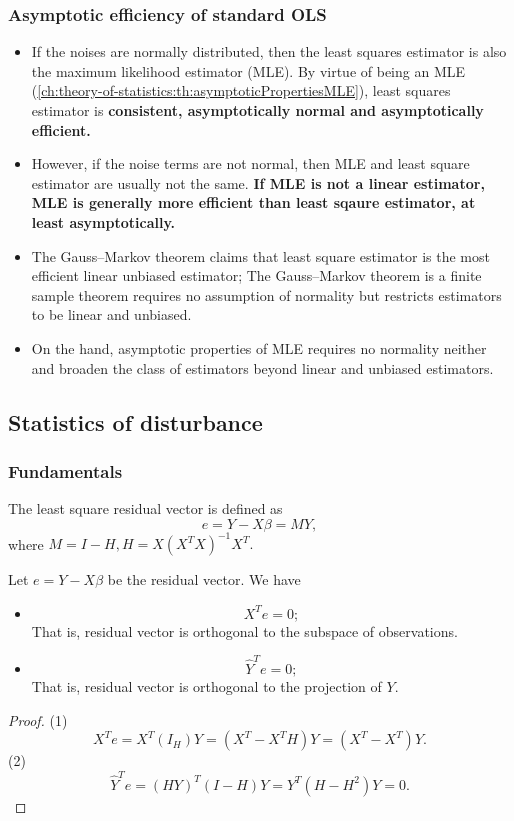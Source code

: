 \begin{refsection}
\subsubsection{Asymptotic efficiency of standard OLS}
\begin{remark}\hfill	
\begin{itemize}
	\item If the noises are normally distributed, then the least squares estimator is also the maximum likelihood estimator (MLE). By virtue of being an MLE (\autoref{ch:theory-of-statistics:th:asymptoticPropertiesMLE}), least squares estimator is \textbf{consistent, asymptotically normal and asymptotically efficient. }
	\item However, if the noise terms are not normal, then MLE and least square estimator are usually not the same. \textbf{If MLE is not a linear estimator, MLE is generally more efficient than least sqaure estimator, at least asymptotically. }
	\item The Gauss–Markov theorem claims that least square estimator is the most efficient linear unbiased estimator; The Gauss–Markov theorem is a finite sample theorem requires no assumption of normality but restricts estimators to be linear and unbiased. 
	\item On the hand, asymptotic properties of MLE requires no normality neither and broaden the class of estimators beyond linear and unbiased estimators. 
\end{itemize}	
\end{remark}


\subsection{Statistics of disturbance}
\subsubsection{Fundamentals}
\begin{definition}\cite[194]{theil1971principles}
The least square residual vector is defined as
$$e = Y - X\beta = MY,$$
where $M = I-H, H = X(X^TX)^{-1}X^T.$	
\end{definition}

\begin{lemma}
Let $e = Y-X\beta$ be the residual vector. 
We have
\begin{itemize}
	\item $$X^Te = 0;$$
	That is, residual vector is orthogonal to the subspace of observations.
	\item $$\hat{Y}^Te = 0;$$
	That is, residual vector is orthogonal to the projection of $Y$.
\end{itemize}	
\end{lemma}
\begin{proof}
(1)	
$$X^Te = X^T(I_H)Y = (X^T - X^TH)Y = (X^T - X^T)Y.$$
(2)
$$\hat{Y}^Te  = (HY)^T(I-H)Y = Y^T(H-H^2)Y = 0.$$
\end{proof}






\end{refsection}
